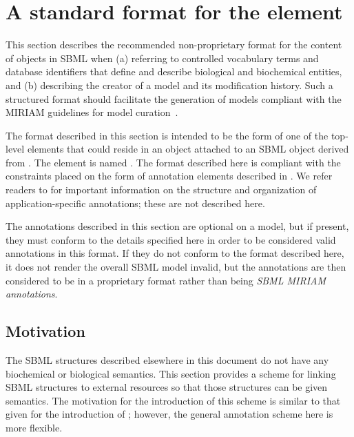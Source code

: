 
\section{A standard format for the  element}
\label{sec:finney-novere}
\label{sec:annotation-standard}

This section describes the recommended non-proprietary format for
the content of \Annotation objects in SBML when (a) referring to
controlled vocabulary terms and database identifiers that define
and describe biological and biochemical entities, and (b)
describing the creator of a model and its modification history.
Such a structured format should facilitate the generation of
models compliant with the MIRIAM guidelines for model
curation~\citep{le_novere:2005}.

The format described in this section is intended to be the form of
one of the top-level elements that could reside in an \Annotation
object attached to an SBML object derived from \SBase.  The
element is named .  The format described here is
compliant with the constraints placed on the form of annotation
elements described in .  We refer
readers to  for important
information on the structure and organization of
application-specific annotations; these are not described here.

The annotations described in this section are optional on a model,
but if present, they must conform to the details specified here in
order to be considered valid annotations in this format.  If they
do not conform to the format described here, it does not render
the overall SBML model invalid, but the annotations are then
considered to be in a proprietary format rather than being
\emph{SBML MIRIAM annotations}.


\subsection{Motivation}

The SBML structures described elsewhere in this document do not
have any biochemical or biological semantics.  This section
provides a scheme for linking SBML structures to external
resources so that those structures can be given semantics.  The
motivation for the introduction of this scheme is similar to that
given for the introduction of ; however, the
general annotation scheme here is more flexible.

